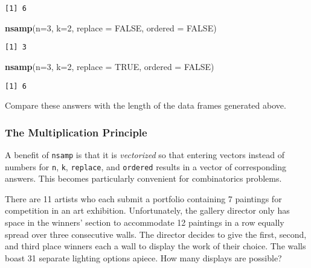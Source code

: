 \documentclass[]{book}
\newenvironment{Shaded}{\begin{snugshade}}{\end{snugshade}}
\newcommand{\KeywordTok}[1]{\textcolor[rgb]{0.13,0.29,0.53}{\textbf{{#1}}}}
\newcommand{\DataTypeTok}[1]{\textcolor[rgb]{0.13,0.29,0.53}{{#1}}}
\newcommand{\DecValTok}[1]{\textcolor[rgb]{0.00,0.00,0.81}{{#1}}}
\newcommand{\OtherTok}[1]{\textcolor[rgb]{0.56,0.35,0.01}{{#1}}}
\newcommand{\NormalTok}[1]{{#1}}
\numberwithin{equation}{chapter}
\numberwithin{figure}{chapter}
\theoremstyle{plain}
\theoremstyle{definition}
\theoremstyle{remark}
\theoremstyle{definition}
\theoremstyle{definition}
\theoremstyle{remark}
\let\BeginKnitrBlock\begin \let\EndKnitrBlock\end
\begin{document}
\begin{verbatim}
[1] 6
\end{verbatim}

\begin{Shaded}
\begin{Highlighting}[]
\KeywordTok{nsamp}\NormalTok{(}\DataTypeTok{n=}\DecValTok{3}\NormalTok{, }\DataTypeTok{k=}\DecValTok{2}\NormalTok{, }\DataTypeTok{replace =} \OtherTok{FALSE}\NormalTok{, }\DataTypeTok{ordered =} \OtherTok{FALSE}\NormalTok{) }
\end{Highlighting}
\end{Shaded}

\begin{verbatim}
[1] 3
\end{verbatim}

\begin{Shaded}
\begin{Highlighting}[]
\KeywordTok{nsamp}\NormalTok{(}\DataTypeTok{n=}\DecValTok{3}\NormalTok{, }\DataTypeTok{k=}\DecValTok{2}\NormalTok{, }\DataTypeTok{replace =} \OtherTok{TRUE}\NormalTok{, }\DataTypeTok{ordered =} \OtherTok{FALSE}\NormalTok{) }
\end{Highlighting}
\end{Shaded}

\begin{verbatim}
[1] 6
\end{verbatim}

Compare these answers with the length of the data frames generated
above.

\subsubsection{The Multiplication
Principle}\label{the-multiplication-principle}

A benefit of \texttt{nsamp} is that it is \emph{vectorized} so that
entering vectors instead of numbers for \texttt{n}, \texttt{k},
\texttt{replace}, and \texttt{ordered} results in a vector of
corresponding answers. This becomes particularly convenient for
combinatorics problems.

\bigskip

\BeginKnitrBlock{example}
\protect\hypertarget{ex:unnamed-chunk-143}{}{\label{ex:unnamed-chunk-143}}There
are 11 artists who each submit a portfolio containing 7 paintings for
competition in an art exhibition. Unfortunately, the gallery director
only has space in the winners' section to accommodate 12 paintings in a
row equally spread over three consecutive walls. The director decides to
give the first, second, and third place winners each a wall to display
the work of their choice. The walls boast 31 separate lighting options
apiece. How many displays are possible?
\EndKnitrBlock{example}
\end{document}
